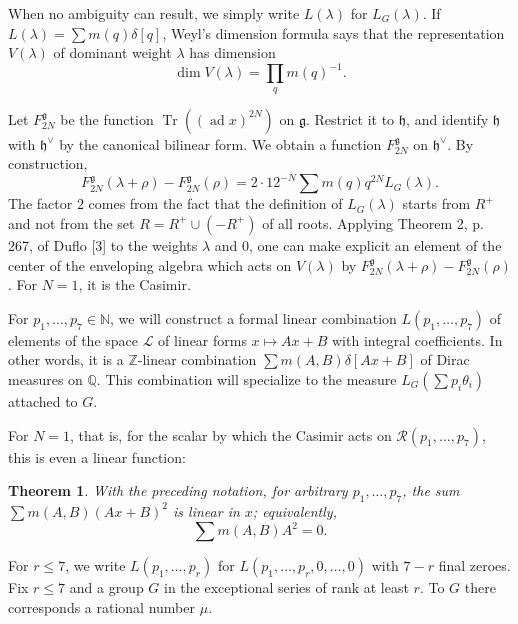 \documentclass[11pt,a4paper]{article}
\theoremstyle{plain}
\newtheorem{theorem}{Theorem}
\theoremstyle{definition}
\DeclareMathOperator{\Tr}{Tr}
\DeclareMathOperator{\ad}{ad}
\begin{document}
When no ambiguity can result, we simply write $L(\lambda)$ for $L_G(\lambda)$. If $L(\lambda)=\sum m(q)\delta[q]$, Weyl's dimension formula says that the representation $V(\lambda)$ of dominant weight $\lambda$ has dimension
\begin{equation}\label{eq:2}
\dim V(\lambda)=\prod_q m(q)^{-1}.
\end{equation}

Let $F_{2N}^{\mathfrak g}$ be the function $\Tr((\ad x)^{2N})$ on $\mathfrak g$. Restrict it to $\mathfrak h$, and identify $\mathfrak h$ with $\mathfrak h^\vee$ by the canonical bilinear form. We obtain a function $F_{2N}^{\mathfrak g}$ on $\mathfrak h^\vee$. By construction,
\begin{equation}\label{eq:3}
F_{2N}^{\mathfrak g}(\lambda+\rho)-F_{2N}^{\mathfrak g}(\rho)=2\cdot 12^{-N}\sum m(q)q^{2N}L_G(\lambda).
\end{equation}
The factor $2$ comes from the fact that the definition of $L_G(\lambda)$ starts from $R^+$ and not from the set $R=R^+\cup(-R^+)$ of all roots. Applying Theorem 2, p. 267, of Duflo [3] to the weights $\lambda$ and $0$, one can make explicit an element of the center of the enveloping algebra which acts on $V(\lambda)$ by $F_{2N}^{\mathfrak g}(\lambda+\rho)-F_{2N}^{\mathfrak g}(\rho)$. For $N=1$, it is the Casimir.

\smallskip

For $p_1,\ldots,p_7\in\mathbb N$, we will construct a formal linear combination $L(p_1,\ldots,p_7)$ of elements of the space $\mathcal L$ of linear forms $x\mapsto Ax+B$ with integral coefficients. In other words, it is a $\mathbb Z$-linear combination $\sum m(A,B)\delta[Ax+B]$ of Dirac measures on $\mathbb Q$. This combination will specialize to the measure $L_G(\sum p_i\theta_i)$ attached to $G$.

For $N=1$, that is, for the scalar by which the Casimir acts on $\mathcal R(p_1,\ldots,p_7)$, this is even a linear function:

\begin{theorem}\label{thm:2}
With the preceding notation, for arbitrary $p_1,\ldots,p_7$, the sum $\sum m(A,B)(Ax+B)^2$ is linear in $x$; equivalently,
\begin{equation}\label{eq:7}
\sum m(A,B)A^2=0.
\end{equation}
\end{theorem}

For $r\leq7$, we write $L(p_1,\ldots,p_r)$ for $L(p_1,\ldots,p_r,0,\ldots,0)$ with $7-r$ final zeroes. Fix $r\leq7$ and a group $G$ in the exceptional series of rank at least $r$. To $G$ there corresponds a rational number $\mu$.
\end{document}
